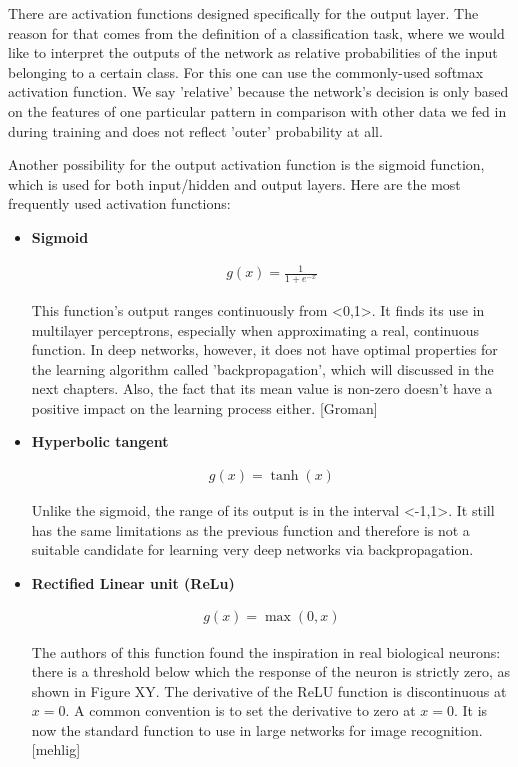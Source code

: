 There are activation functions designed specifically for the output layer. The reason for that comes from the definition of a classification task, where we would like to interpret the outputs of the network as relative probabilities of the input belonging to a certain class. For this one can use the commonly-used softmax activation function. We say 'relative' because the network's decision is only based on the features of one particular pattern in comparison with other data we fed in during training and does not reflect 'outer' probability at all. 

Another possibility for the output activation function is the sigmoid function, which is used for both input/hidden and output layers. Here are the most frequently used activation functions:

\begin{itemize}

\item \textbf{Sigmoid}

\begin{gather}
	g(x)=\frac{1}{1 + e^{-x}}
\end{gather}

This function's output ranges continuously from <0,1>. It finds its use in multilayer perceptrons, especially when approximating a real, continuous function. In deep networks, however, it does not have optimal properties for the learning algorithm called 'backpropagation', which will discussed in the next chapters. Also, the fact that its mean value is non-zero doesn't have a positive impact on the learning process either. [Groman]

\item \textbf{Hyperbolic tangent}

\begin{gather}
	g(x)=\tanh (x)
\end{gather}

Unlike the sigmoid, the range of its output is in the interval <-1,1>. It still has the same limitations as the previous function and therefore is not a suitable candidate for learning very deep networks via backpropagation. 

\item \textbf{Rectified Linear unit (ReLu)}

\begin{gather}
	g(x)=\max (0,x)
\end{gather}

The authors of this function found the inspiration in real biological neurons: there is a threshold below which the response of the neuron is strictly zero, as shown in Figure XY. The derivative of the ReLU function is discontinuous at $ x=0 $. A common convention is to set the derivative to zero at $ x=0 $. It is now the standard function to use in large networks for image recognition. [mehlig]


\end{itemize}
